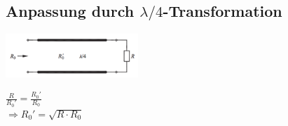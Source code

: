 \begin{multicols}{2}
		\subsection{Anpassung durch $\lambda/4$-Transformation}
			\parbox[c]{5cm}{\includegraphics[width = 5cm]{./bilder/Anp_lambda_4_Transfor}}
			\parbox[c]{4cm}{$\frac{R}{R_0'}= \frac{R_0'}{R_0}$\\
			$\Rightarrow R_0' = \sqrt{R \cdot R_0}$}\\
			
	
	\end{multicols}
	
		